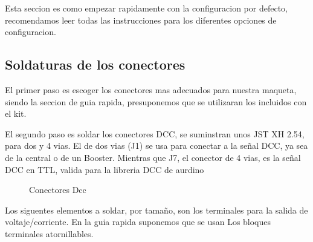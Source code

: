 
Esta seccion es como empezar rapidamente con la configuracion por defecto, recomendamos leer todas las instrucciones para los diferentes
opciones de configuracion. 
\subsection{Soldaturas de los conectores}
El primer paso es escoger los conectores mas adecuados para nuestra maqueta, siendo la seccion de guia rapida, presuponemos que se utilizaran
los incluidos con el kit.

El segundo paso es soldar los conectores DCC, se suminstran unos JST XH 2.54, para dos y 4 vias. El de dos vias (J1) se usa para conectar a la señal DCC,
ya sea de la central o de un Booster. Mientras que J7, el conector de 4 vias, es la señal DCC
en TTL, valida para la libreria DCC de aurdino
\begin{figure}[h]
    \centering
    \caption{Conectores Dcc}
    \label{fig:DccConnectors}
\end{figure}

Los siguentes elementos a soldar, por tamaño, son los terminales para la salida de voltaje/corriente. 
En la guia rapida suponemos que se usan Los bloques terminales atornillables.

